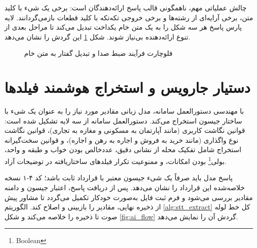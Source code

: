 \documentclass[11pt, a4paper]{report}
\newcommand{\enfootnote}[1]{\footnote{\foreignlanguage{english}{#1}}}
\begin{document}
چالش عملیاتی مهم، ناهمگونی قالب پاسخ ارائه‌دهندگان است: برخی یک شیء با کلید متن، برخی آرایه‌ای از رشته‌ها و برخی خروجی تکه‌تکه با کلید قطعات بازمی‌گردانند. لایه پارس پاسخ هر سه شکل را به یک متن خام یکداخت تبدیل می‌کند تا مراحل بعدی از تنوع ارائه‌دهنده بی‌نیاز شوند. شکل \ref{fig:stt_flow} این گردش را نشان می‌دهد.

\begin{figure}[htbp]
  \centering
  \caption{فلوچارت فرآیند ضبط صدا و تبدیل گفتار به متن خام}
  \label{fig:stt_flow}
\end{figure}

\section{دستیار جارویس و استخراج هوشمند فیلدها}
با مهندسی دستورالعمل سامانه، مدل زبانی مقادیر مورد نیاز را به عنوان یک شیء با ساختار جیسون استخراج می‌کند. دستورالعمل سامانه از سه لایه تشکیل شده است: قوانین نگاشت کاربری (مانند آپارتمان به مسکونی و مغازه به تجاری)، قوانین نگاشت نوع واگذاری (مانند خرید به فروش و اجاره به رهن و اجاره)، و قوانین سخت‌گیرانه استخراج شامل تفکیک محله از نشانی دقیق، عددخالص بودن خواب و طبقه و واحد، بولی\enfootnote{Boolean} بودن امکانات، و ممنوعیت تکرار فیلدهای ساختاریافته در توضیحات آزاد.

پاسخ مدل باید صرفاً یک شیء جیسون معتبر با قرارداد ثابت باشد؛ کد ۴-۱ نسخه خلاصه‌شده این قرارداد را نشان می‌دهد. پس از دریافت پاسخ، اعتبار جیسون و دامنه مقادیر بررسی می‌شود و فرم ثبت فایل به‌صورت خودکار تکمیل می‌گردد تا مشاور پیش از ذخیره نهایی، مقادیر را بازبینی و اصلاح کند. الگوریتم \ref{alg:stt_extract} کل خط لوله صوت تا ذخیره را خلاصه می‌کند و شکل \ref{fig:ai_flow} گردش آن را نمایش می‌دهد.
\end{document}
